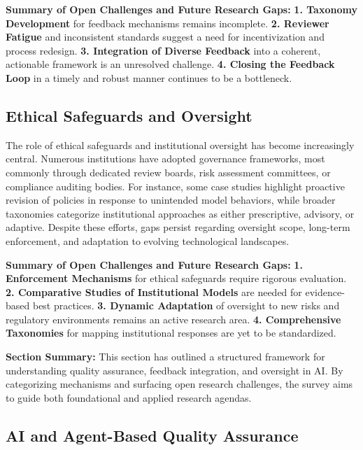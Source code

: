 \documentclass[sigconf]{acmart}
\begin{document}
\textbf{Summary of Open Challenges and Future Research Gaps:}
\textbf{1. Taxonomy Development} for feedback mechanisms remains incomplete.
\textbf{2. Reviewer Fatigue} and inconsistent standards suggest a need for incentivization and process redesign.
\textbf{3. Integration of Diverse Feedback} into a coherent, actionable framework is an unresolved challenge.
\textbf{4. Closing the Feedback Loop} in a timely and robust manner continues to be a bottleneck.

\subsection{Ethical Safeguards and Oversight}

The role of ethical safeguards and institutional oversight has become increasingly central. Numerous institutions have adopted governance frameworks, most commonly through dedicated review boards, risk assessment committees, or compliance auditing bodies. For instance, some case studies highlight proactive revision of policies in response to unintended model behaviors, while broader taxonomies categorize institutional approaches as either prescriptive, advisory, or adaptive. Despite these efforts, gaps persist regarding oversight scope, long-term enforcement, and adaptation to evolving technological landscapes.

\textbf{Summary of Open Challenges and Future Research Gaps:}
\textbf{1. Enforcement Mechanisms} for ethical safeguards require rigorous evaluation.
\textbf{2. Comparative Studies of Institutional Models} are needed for evidence-based best practices.
\textbf{3. Dynamic Adaptation} of oversight to new risks and regulatory environments remains an active research area.
\textbf{4. Comprehensive Taxonomies} for mapping institutional responses are yet to be standardized.

\textbf{Section Summary:} This section has outlined a structured framework for understanding quality assurance, feedback integration, and oversight in AI. By categorizing mechanisms and surfacing open research challenges, the survey aims to guide both foundational and applied research agendas.

\subsection{AI and Agent-Based Quality Assurance}
\end{document}
